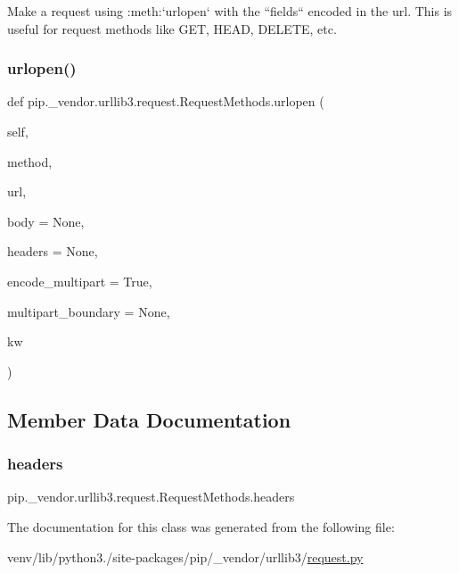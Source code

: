\begin{DoxyVerb}Make a request using :meth:`urlopen` with the ``fields`` encoded in
the url. This is useful for request methods like GET, HEAD, DELETE, etc.
\end{DoxyVerb}
 \mbox{\label{classpip_1_1__vendor_1_1urllib3_1_1request_1_1RequestMethods_a34dbfb4bac40e78b8f474f037b7bb918}} 
\subsubsection{\texorpdfstring{urlopen()}{urlopen()}}
{\footnotesize\ttfamily def pip.\+\_\+vendor.\+urllib3.\+request.\+Request\+Methods.\+urlopen (\begin{DoxyParamCaption}\item[{}]{self,  }\item[{}]{method,  }\item[{}]{url,  }\item[{}]{body = {\ttfamily None},  }\item[{}]{headers = {\ttfamily None},  }\item[{}]{encode\+\_\+multipart = {\ttfamily True},  }\item[{}]{multipart\+\_\+boundary = {\ttfamily None},  }\item[{}]{kw }\end{DoxyParamCaption})}



\subsection{Member Data Documentation}
\mbox{\label{classpip_1_1__vendor_1_1urllib3_1_1request_1_1RequestMethods_a507ade459b427bd81a5a8849563702e3}} 
\subsubsection{\texorpdfstring{headers}{headers}}
{\footnotesize\ttfamily pip.\+\_\+vendor.\+urllib3.\+request.\+Request\+Methods.\+headers}



The documentation for this class was generated from the following file\+:\begin{DoxyCompactItemize}
\item 
venv/lib/python3./site-\/packages/pip/\+\_\+vendor/urllib3/\hyperlink{request_8py}{request.\+py}\end{DoxyCompactItemize}
